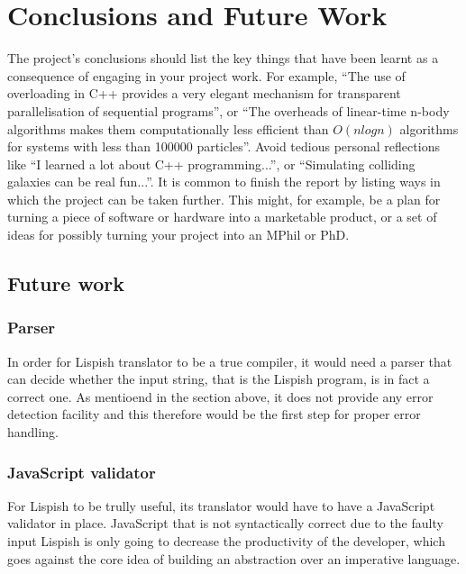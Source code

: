 \chapter{Conclusions and Future Work}

The project's conclusions should list the key things that have been learnt as a consequence of engaging in your project work. For example, ``The use of overloading in C++ provides a very elegant mechanism for transparent parallelisation of sequential programs'', or ``The overheads of linear-time n-body algorithms makes them computationally less efficient than $O(n log n)$ algorithms for systems with less than 100000 particles''. Avoid tedious personal reflections like ``I learned a lot about C++ programming...'', or ``Simulating colliding galaxies can be real fun...''. It is common to finish the report by listing ways in which the project can be taken further. This might, for example, be a plan for turning a piece of software or hardware into a marketable product, or a set of ideas for possibly turning your project into an MPhil or PhD.

\section{Future work}
\subsection{Parser}
In order for Lispish translator to be a true compiler, it would need a parser that can decide whether the input string, that is the Lispish program, is in fact a correct one. As mentioend in the section above, it does not provide any error detection facility and this therefore would be the first step for proper error handling. 
\subsection{JavaScript validator}
For Lispish to be trully useful, its translator would have to have a JavaScript validator in place. 
JavaScript that is not syntactically correct due to the faulty input Lispish is only going to decrease the productivity of the developer, which goes against the core idea of building an abstraction over an imperative language.